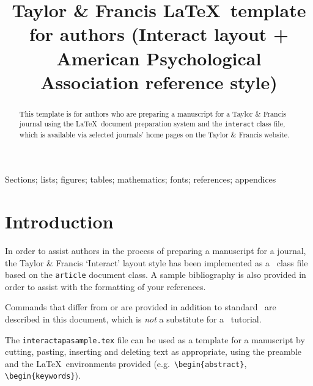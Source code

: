 \documentclass[]{interact}
\theoremstyle{plain}%
\theoremstyle{definition}
\theoremstyle{remark}
\begin{document}

\title{Taylor \& Francis \LaTeX\ template for authors (\textsf{Interact} layout + American Psychological Association reference style)}

\author{
}

\maketitle

\begin{abstract}
This template is for authors who are preparing a manuscript for a Taylor \& Francis journal using the \LaTeX\ document preparation system and the \texttt{interact} class file, which is available via selected journals' home pages on the Taylor \& Francis website.
\end{abstract}

\begin{keywords}
Sections; lists; figures; tables; mathematics; fonts; references; appendices
\end{keywords}


\section{Introduction}

In order to assist authors in the process of preparing a manuscript for a journal, the Taylor \& Francis `\textsf{Interact}' layout style has been implemented as a \LaTeXe\ class file based on the \texttt{article} document class. A sample bibliography is also provided in order to assist with the formatting of your references.

Commands that differ from or are provided in addition to standard \LaTeXe\ are described in this document, which is \emph{not} a substitute for a \LaTeXe\ tutorial.

The \texttt{interactapasample.tex} file can be used as a template for a manuscript by cutting, pasting, inserting and deleting text as appropriate, using the preamble and the \LaTeX\ environments provided (e.g.\ \verb"\begin{abstract}", \verb"\begin{keywords}").
\end{document}
